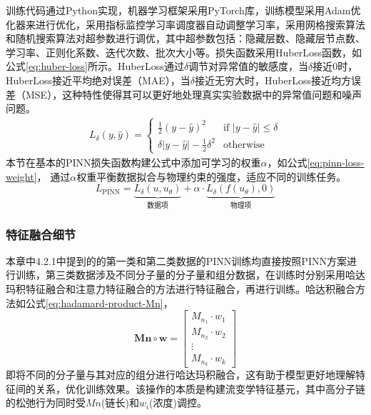 训练代码通过Python实现，机器学习框架采用PyTorch库，训练模型采用Adam优化器来进行优化，采用指标监控学习率调度器自动调整学习率，采用网格搜索算法和随机搜索算法对超参数进行调优，其中超参数包括：隐藏层数、隐藏层节点数、学习率、正则化系数、迭代次数、批次大小等。损失函数采用HuberLoss函数，如公式\eqref{eq:huber-loss}所示。HuberLoss通过$\delta$调节对异常值的敏感度，当$\delta$接近0时，HuberLoss接近平均绝对误差（MAE），当$\delta$接近无穷大时，HuberLoss接近均方误差（MSE），这种特性使得其可以更好地处理真实实验数据中的异常值问题和噪声问题。
\begin{equation}
  \begin{aligned}
    L_\delta(y, \hat{y}) =
    \begin{cases}
      \frac{1}{2}(y - \hat{y})^2                 & \text{if } |y - \hat{y}| \le \delta    \\
      \delta |y - \hat{y}| - \frac{1}{2}\delta^2 & \text{otherwise} \label{eq:huber-loss}
    \end{cases}
  \end{aligned}
\end{equation}
本节在基本的PINN损失函数构建公式中添加可学习的权重$\alpha$，如公式\eqref{eq:pinn-loss-weight}， 通过$\alpha$权重平衡数据拟合与物理约束的强度，适应不同的训练任务。
\begin{equation}
  L_{\text{PINN}} = \underbrace{L_\delta(u, u_\theta)}_{\text{数据项}} + \alpha \cdot \underbrace{L_\delta(f(u_\theta), 0)}_{\text{物理项}} \label{eq:pinn-loss-weight}
\end{equation}

\subsubsection{特征融合细节}
本章中4.2.1中提到的的第一类和第二类数据的PINN训练均直接按照PINN方案进行训练，第三类数据涉及不同分子量的分子量和组分数据，在训练时分别采用哈达玛积特征融合和注意力特征融合的方法进行特征融合，再进行训练。哈达积融合方法如公式\eqref{eq:hadamard-product-Mn}，
\begin{equation}
  \mathbf{Mn} \circ \mathbf{w} =
  \begin{bmatrix}
    M_{n_1} \cdot w_1 \\
    M_{n_2} \cdot w_2 \\
    \vdots            \\
    M_{n_k} \cdot w_k
  \end{bmatrix} \label{eq:hadamard-product-Mn}
\end{equation}
即将不同的分子量与其对应的组分进行哈达玛积融合，这有助于模型更好地理解特征间的关系，优化训练效果。该操作的本质是构建流变学特征基元，其中高分子链的松弛行为同时受$Mn$(链长)和$w_i$(浓度)调控。

